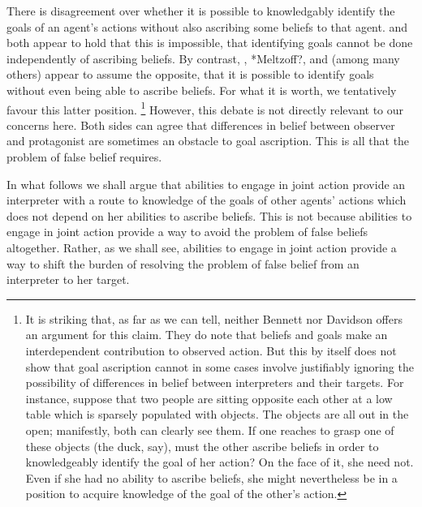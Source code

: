 \documentclass[14pt,a4paper]{extarticle}
\begin{document}
There is disagreement over whether it is possible to knowledgably identify the goals of an agent's actions without also ascribing some beliefs to that agent.  
\citet[pp.48--50]{Bennett:1976rg}
and 
\citet{Davidson:1974gh}
both appear to hold that this is impossible,
that identifying goals cannot be done independently of ascribing beliefs.
By contrast,
\citet{Gergely:1995sq},
*Meltzoff?,
\citet{Baillargeon:gx}
and 
\citet{Woodward:1998dm}
(among many others)
appear to assume the opposite, 
that it is possible to identify goals without even being able to ascribe beliefs.
For what it is worth, we tentatively favour this latter position.%
\footnote{
It is striking that, as far as we can tell, neither Bennett nor Davidson offers an argument for this claim.
They do note that beliefs and goals make an interdependent contribution to observed action.
But this by itself does not show that goal ascription cannot in some cases involve justifiably ignoring the possibility of differences in belief between interpreters and their targets.
For instance,
suppose that two people are sitting opposite each other at a low table
 which is 
sparsely populated with objects.
The objects are all out in the open; manifestly, both can clearly see them.
If one reaches to grasp one of these objects (the duck, say), 
must the other ascribe beliefs in order to knowledgeably identify the goal of her action?
On the face of it, she need not.  
Even if she had no ability to ascribe beliefs, she might nevertheless be in a position to acquire knowledge of the goal of the other's action.
}
However, this debate is not directly relevant to our concerns here.
Both sides can agree that 
differences in belief between observer and protagonist
are sometimes an obstacle to goal ascription.
This is all that the problem of false belief requires.

In what follows we shall argue that abilities to engage in joint action provide an interpreter with a route to knowledge of the goals of other agents' actions which does not depend on her abilities to ascribe beliefs.
This is not because abilities to engage in joint action provide a way to avoid the problem of false beliefs altogether.
Rather, as we shall see, abilities to engage in joint action provide a way to shift the burden of resolving the problem of false belief from an interpreter to her target.
\end{document}
